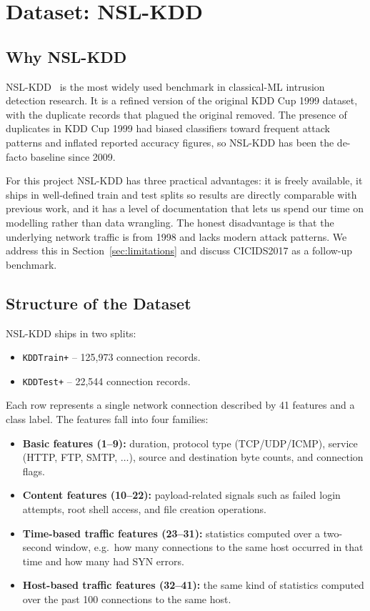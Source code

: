 \documentclass[11pt, a4paper]{article}
\begin{document}
\section{Dataset: NSL-KDD}
\label{sec:dataset}

\subsection{Why NSL-KDD}
NSL-KDD~\cite{tavallaee2009} is the most widely used benchmark in classical-ML intrusion detection research. It is a refined version of the original KDD Cup 1999 dataset, with the duplicate records that plagued the original removed. The presence of duplicates in KDD Cup 1999 had biased classifiers toward frequent attack patterns and inflated reported accuracy figures, so NSL-KDD has been the de-facto baseline since 2009.

For this project NSL-KDD has three practical advantages: it is freely available, it ships in well-defined train and test splits so results are directly comparable with previous work, and it has a level of documentation that lets us spend our time on modelling rather than data wrangling. The honest disadvantage is that the underlying network traffic is from 1998 and lacks modern attack patterns. We address this in Section~\ref{sec:limitations} and discuss CICIDS2017 as a follow-up benchmark.

\subsection{Structure of the Dataset}
NSL-KDD ships in two splits:
\begin{itemize}
    \item \texttt{KDDTrain+} -- 125,973 connection records.
    \item \texttt{KDDTest+}  -- 22,544 connection records.
\end{itemize}

Each row represents a single network connection described by 41 features and a class label. The features fall into four families:

\begin{itemize}
    \item \textbf{Basic features (1--9):} duration, protocol type (TCP/UDP/ICMP), service (HTTP, FTP, SMTP, $\dots$), source and destination byte counts, and connection flags.
    \item \textbf{Content features (10--22):} payload-related signals such as failed login attempts, root shell access, and file creation operations.
    \item \textbf{Time-based traffic features (23--31):} statistics computed over a two-second window, e.g.\ how many connections to the same host occurred in that time and how many had SYN errors.
    \item \textbf{Host-based traffic features (32--41):} the same kind of statistics computed over the past 100 connections to the same host.
\end{itemize}
\end{document}
